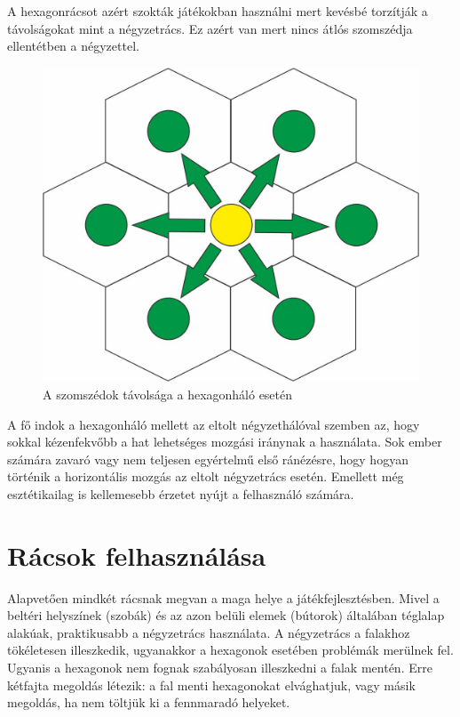 \noindent A hexagonrácsot azért szokták játékokban használni mert kevésbé torzítják a távolságokat mint a négyzetrács. Ez azért van mert nincs átlós szomszédja ellentétben a négyzettel.

\begin{figure}[h!]
\centering
\includegraphics[scale=0.4]{kepek/HexDistance.jpg}
\caption{A szomszédok távolsága a hexagonháló esetén}
\label{fig:HexDistance}
\end{figure}

\noindent A fő indok a hexagonháló mellett az eltolt négyzethálóval szemben az, hogy sokkal kézenfekvőbb a hat lehetséges mozgási iránynak a használata. Sok ember számára zavaró vagy nem teljesen egyértelmű első ránézésre, hogy hogyan történik a horizontális mozgás az eltolt négyzetrács esetén. Emellett még esztétikailag is kellemesebb érzetet nyújt a felhasználó számára.

\section{Rácsok felhasználása}

Alapvetően mindkét rácsnak megvan a maga helye a játékfejlesztésben. 
\newline
\newline Mivel a beltéri helyszínek (szobák) és az azon belüli elemek (bútorok) általában téglalap alakúak, praktikusabb a négyzetrács használata. A négyzetrács a falakhoz tökéletesen illeszkedik, ugyanakkor a hexagonok esetében problémák merülnek fel. Ugyanis a hexagonok nem fognak szabályosan illeszkedni a falak mentén. Erre kétfajta megoldás létezik: a fal menti hexagonokat elvághatjuk, vagy másik megoldás, ha nem töltjük ki a fennmaradó helyeket.

